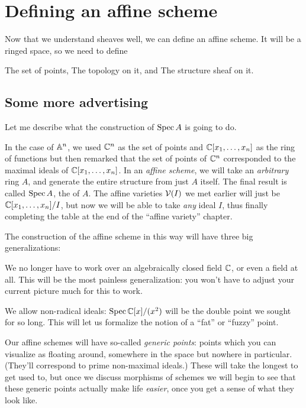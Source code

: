 \chapter{Defining an affine scheme}
Now that we understand sheaves well,
we can define an affine scheme.
It will be a ringed space, so we need to define
\begin{itemize}
	\ii The set of points,
	\ii The topology on it, and
	\ii The structure sheaf on it.
\end{itemize}

\section{Some more advertising}
Let me describe what the construction of $\operatorname{Spec} A$ is going to do.

In the case of $\mathbb A^n$, we used $\mathbb C^n$ as the set of points
and $\mathbb C[x_1, \dots, x_n]$ as the ring of functions
but then remarked that the set of points
of $\mathbb C^n$ corresponded to the maximal ideals of $\mathbb C[x_1, \dots, x_n]$.
In an \emph{affine scheme}, we will take an \emph{arbitrary} ring $A$,
and generate the entire structure from just $A$ itself.
The final result is called $\operatorname{Spec} A$, the  of $A$.
The affine varieties $\mathcal V(I)$ we met earlier will just be
$\mathbb C[x_1, \dots, x_n] / I$, but now we will be able to take
\emph{any} ideal $I$, thus finally completing the table at the end
of the ``affine variety'' chapter.

The construction of the affine scheme in this way
will have three big generalizations:
\begin{enumerate}
	\ii We no longer have to work over an algebraically
	closed field $\mathbb C$, or even a field at all.
	This will be the most painless generalization:
	you won't have to adjust your current picture much for this to work.

	\ii We allow non-radical ideals:
	$\operatorname{Spec} \mathbb C[x] / (x^2)$ will be the double point
	we sought for so long.
	This will let us formalize the notion of a ``fat'' or ``fuzzy'' point.

	\ii Our affine schemes will have so-called \emph{generic points}:
	points which you can visualize as floating around,
	somewhere in the space but nowhere in particular.
	(They'll correspond to prime non-maximal ideals.)
	These will take the longest to get used to,
	but once we discuss morphisms of schemes
	we will begin to see that these generic points actually make life
	\emph{easier}, once you get a sense of what they look like.
\end{enumerate}

